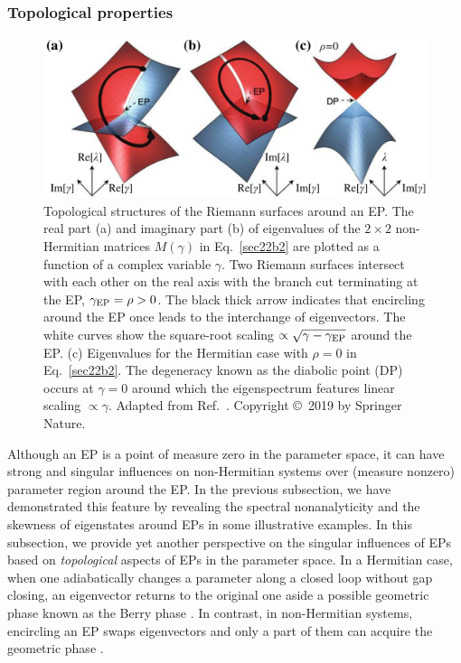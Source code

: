 \documentclass{tADP2e}
\theoremstyle{plain}
\theoremstyle{plain}
\theoremstyle{definition}
\begin{document}
\subsubsection{Topological properties\label{seceptopo}}
\begin{figure}
\begin{center}
\includegraphics[width=12.5cm]{./Figures/fig_2_ep_topo.pdf}
\end{center}
\caption{ Topological structures of the Riemann surfaces around an EP. The real part (a) and imaginary part (b) of eigenvalues of the $2\times 2$ non-Hermitian matrices $M(\gamma)$ in Eq.~\eqref{sec22b2} are plotted as a function of a complex variable $\gamma$. Two Riemann surfaces intersect with each other  on the real axis with the branch cut terminating at the EP, $\gamma_{\rm EP}=\rho>0$. The black thick arrow indicates that encircling around the EP once leads to the interchange of eigenvectors. The white curves show the square-root scaling $\propto\sqrt{\gamma-\gamma_{\rm EP}}$ around the EP. (c) Eigenvalues for the Hermitian case with $\rho=0$ in Eq.~\eqref{sec22b2}. The degeneracy known as the diabolic point (DP) occurs at $\gamma=0$ around which the eigenspectrum features linear scaling $\propto\gamma$. Adapted from Ref.~\cite{SKO19}. Copyright \copyright\,   2019 by Springer Nature.}
\label{fig:2topo}
\end{figure}
Although an EP is a point of measure zero in the parameter space, it can have strong and singular influences on non-Hermitian systems over (measure nonzero) parameter region around the EP. In the previous subsection, we have demonstrated this feature by revealing the spectral nonanalyticity and the skewness of eigenstates around EPs in some illustrative examples. In this subsection, we provide yet another perspective on the singular influences of EPs based on \emph{topological} aspects of EPs in the parameter space. In a Hermitian case, when one adiabatically changes a parameter along a closed loop without gap closing, an eigenvector returns to the original one aside a possible geometric phase known as the Berry phase \cite{BMV84}. In contrast, in  non-Hermitian systems, encircling an EP swaps  eigenvectors and only a part of them can acquire the geometric phase \cite{DC04,LR09}.
\end{document}
